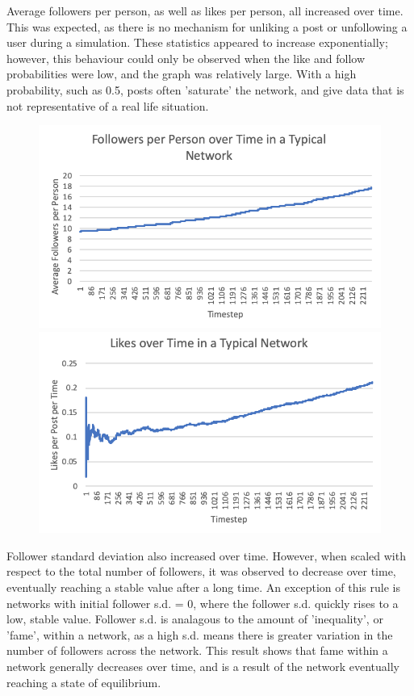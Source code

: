 \documentclass{article}
\begin{document}
Average followers per person, as well as likes per person, all increased over time.
This was expected, as there is no mechanism for unliking a post or unfollowing a user
during a simulation. These statistics appeared to increase exponentially;
however, this behaviour could only be observed when the like and follow probabilities
were low, and the graph was relatively large. With a high probability, such as 0.5, posts often 'saturate' the network,
and give data that is not representative of a real life situation.
\begin{figure}[H]
\centering
\begin{minipage}{.5\textwidth}
  \centering
  \includegraphics[width=\linewidth]{follAv}
\end{minipage}\hfill
\begin{minipage}{.5\textwidth}
  \centering
  \includegraphics[width=\linewidth]{likes}
\end{minipage}
\end{figure}

Follower standard deviation also increased over time. However, when scaled with respect
to the total number of followers, it was observed to decrease over time,
eventually reaching a stable value after a long time.
An exception of this rule is networks with initial follower s.d. = 0,
where the follower s.d. quickly rises to a low, stable value.
Follower s.d. is analagous to the amount of 'inequality', or 'fame',
within a network, as a high s.d. means there is greater variation in the number
of followers across the network.
This result shows that fame within a network generally decreases over time,
and is a result of the network eventually reaching a state of equilibrium.
\end{document}
